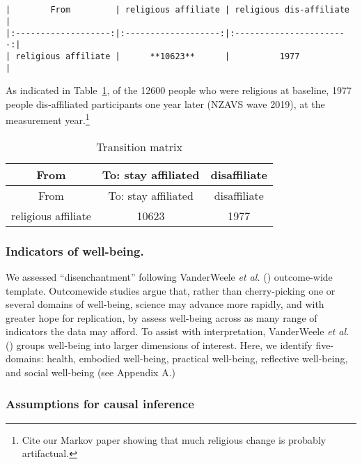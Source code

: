 \documentclass[
  singlecolumn,
  9pt]{article}
\begin{document}
\begin{verbatim}


|        From         | religious affiliate | religious dis-affiliate |
|:-------------------:|:-------------------:|:-----------------------:|
| religious affiliate |      **10623**      |          1977           |
\end{verbatim}

As indicated in Table~\ref{tbl-transition}, of the 12600 people who were
religious at baseline, 1977 people dis-affiliated participants one year
later (NZAVS wave 2019), at the measurement year.\footnote{Cite our
  Markov paper showing that much religious change is probably
  artifactual.}

\begin{longtable}[]{@{}ccc@{}}
\caption{Transition matrix}\label{tbl-transition}\tabularnewline
\toprule\noalign{}
From & To: stay affiliated & disaffiliate \\
\midrule\noalign{}
\endfirsthead
\toprule\noalign{}
From & To: stay affiliated & disaffiliate \\
\midrule\noalign{}
\endhead
\bottomrule\noalign{}
\endlastfoot
religious affiliate & 10623 & 1977 \\
\end{longtable}

\subsubsection{Indicators of
well-being.}\label{indicators-of-well-being.}

We assessed ``disenchantment'' following VanderWeele \emph{et al.}
() outcome-wide template.
Outcomewide studies argue that, rather than cherry-picking one or
several domains of well-being, science may advance more rapidly, and
with greater hope for replication, by assess well-being across as many
range of indicators the data may afford. To assist with interpretation,
VanderWeele \emph{et al.} () groups
well-being into larger dimensions of interest. Here, we identify
five-domains: health, embodied well-being, practical well-being,
reflective well-being, and social well-being (see Appendix A.)

\subsubsection{Assumptions for causal
inference}\label{assumptions-for-causal-inference}
\end{document}
